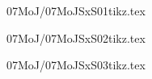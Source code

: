 \documentclass[9pt, xcolor={svgnames, x11names},professionalfonts]{beamer}
\def\scale{1}
\begin{document}

% 	


% 	


% 	


% 	


% 	


\begin{frame}{07MoJ/07MoJSxS01tikz.tex}
	\def\scale{1}
	
\end{frame}


\begin{frame}{07MoJ/07MoJSxS02tikz.tex}
	\def\scale{1.25}
	
\end{frame}


\begin{frame}{07MoJ/07MoJSxS03tikz.tex}
	\def\scale{1.25}
	
\end{frame}


% 

\end{document}
